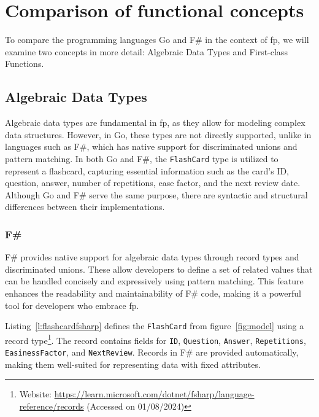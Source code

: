 
\chapter{Comparison of functional concepts}\label{chap:comparison}
To compare the programming languages Go and F\# in the context of \ac{fp}, we will examine two concepts in more detail: Algebraic Data Types and First-class Functions.

    \section{Algebraic Data Types}\label{sec:algebraic-data-types}
    Algebraic data types are fundamental in \ac{fp}, as they allow for modeling complex data structures. However, in Go, these types are not directly supported, unlike in languages such as F\#, which has native support for discriminated unions and pattern matching. In both Go and F\#, the \texttt{FlashCard} type is utilized to represent a flashcard, capturing essential information such as the card's ID, question, answer, number of repetitions, ease factor, and the next review date. Although Go and F\# serve the same purpose, there are syntactic and structural differences between their implementations.

    \subsection*{F\#}
    F\# provides native support for algebraic data types through record types and discriminated unions. These allow developers to define a set of related values that can be handled concisely and expressively using pattern matching. This feature enhances the readability and maintainability of F\# code, making it a powerful tool for developers who embrace \ac{fp}.

    Listing\ \ref{l:flashcardfsharp} defines the \texttt{FlashCard} from figure\ \ref{fig:model} using a record type\footnote{Website: \url{https://learn.microsoft.com/dotnet/fsharp/language-reference/records} (Accessed on 01/08/2024)}. The record contains fields for \texttt{ID}, \texttt{Question}, \texttt{Answer}, \texttt{Repetitions}, \texttt{EasinessFactor}, and \texttt{NextReview}. Records in F\# are provided automatically, making them well-suited for representing data with fixed attributes.

